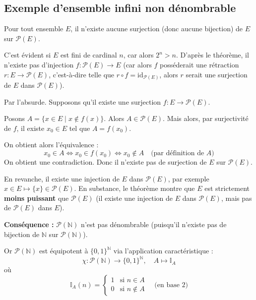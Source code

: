 \documentclass[a4paper,11pt]{article}
\newcommand{\N}{\mathbb{N}}
\newcommand{\mot}[1]{\textcolor{bordeaux}{\textbf{#1}}}
\begin{document}
\subsection*{Exemple d'ensemble infini non dénombrable}

\begin{theoreme}[Cantor]
Pour tout ensemble $E$, il n'existe aucune surjection (donc aucune bijection) de $E$ sur $\mathcal{P}(E)$.
\end{theoreme}

\begin{remarque}
C'est évident si $E$ est fini de cardinal $n$, car alors $2^n > n$. D'après le théorème, il n'existe pas d'injection $f : \mathcal{P}(E) \to E$ (car alors $f$ posséderait une rétraction $r : E \to \mathcal{P}(E)$, c'est-à-dire telle que $r \circ f = \text{id}_{\mathcal{P}(E)}$, alors $r$ serait une surjection de $E$ dans $\mathcal{P}(E)$).
\end{remarque}

\begin{demonstration}
Par l'absurde. Supposons qu'il existe une surjection $f : E \to \mathcal{P}(E)$. 

Posons $A = \{x \in E \mid x \notin f(x)\}$. 
Alors $A \in \mathcal{P}(E)$. Mais alors, par surjectivité de $f$, il existe $x_0 \in E$ tel que $A = f(x_0)$. 

On obtient alors l'équivalence :
$$ x_0 \in A \iff x_0 \in f(x_0) \iff x_0 \notin A \quad \text{(par définition de } A \text{)} $$
On obtient une contradiction. Donc il n'existe pas de surjection de $E$ sur $\mathcal{P}(E)$.
\end{demonstration}

\begin{remarque}
En revanche, il existe une injection de $E$ dans $\mathcal{P}(E)$, par exemple $x \in E \mapsto \{x\} \in \mathcal{P}(E)$. En substance, le théorème montre que $E$ est strictement \mot{moins puissant} que $\mathcal{P}(E)$ (il existe une injection de $E$ dans $\mathcal{P}(E)$, mais pas de $\mathcal{P}(E)$ dans $E$).
\end{remarque}

\textbf{Conséquence :} $\mathcal{P}(\N)$ n'est pas dénombrable (puisqu'il n'existe pas de bijection de $\N$ sur $\mathcal{P}(\N)$).

Or $\mathcal{P}(\N)$ est équipotent à $\{0,1\}^{\N}$ via l'application caractéristique :
$$ \chi : \mathcal{P}(\N) \to \{0,1\}^{\N}, \quad A \mapsto \mathbb{I}_A $$
où 
$$ \mathbb{I}_A(n) = \begin{cases} 1 & \text{si } n \in A \\ 0 & \text{si } n \notin A \end{cases} \quad \text{(en base 2)} $$
\end{document}
